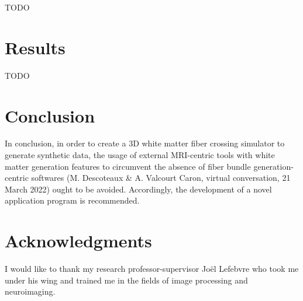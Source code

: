 \documentclass{article}
\begin{document}
  TODO


  \section{Results}\label{sec:results}

  TODO


  \section{Conclusion}\label{sec:conclusion}

  In conclusion, in order to create a 3D white matter fiber crossing simulator to generate synthetic data, the usage of external MRI-centric tools with white matter generation features to circumvent the absence of fiber bundle generation-centric softwares (M. Descoteaux \& A. Valcourt Caron, virtual conversation, 21 March 2022) ought to be avoided.
  Accordingly, the development of a novel application program is recommended.


  \section*{Acknowledgments}\label{sec:thanks}

  I would like to thank my research professor-supervisor Joël Lefebvre who took me under his wing and trained me in the fields of image processing and neuroimaging.


  
  
\end{document}
